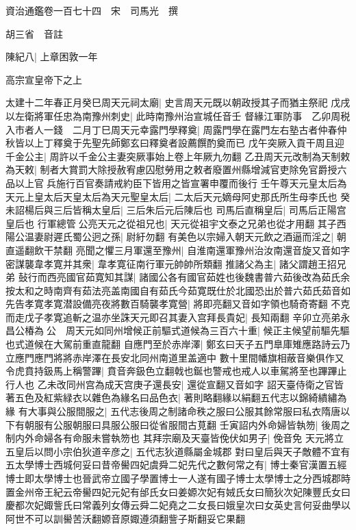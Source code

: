 資治通鑑卷一百七十四　宋　司馬光　撰

胡三省　音註

陳紀八|{
	上章困敦一年}


高宗宣皇帝下之上

太建十二年春正月癸巳周天元祠太廟|{
	史言周天元既以朝政授其子而猶主祭祀}
戊戌以左衛將軍任忠為南豫州刺史|{
	此時南豫州治宣城任音壬}
督緣江軍防事　乙卯周税入市者人一錢　二月丁巳周天元幸露門學釋奠|{
	周露門學在露門左右塾古者仲春仲秋皆以上丁釋奠于先聖先師鄭玄曰釋奠者設薦饌酌奠而已}
戊午突厥入貢干周且迎千金公主|{
	周許以千金公主妻突厥事始上卷上年厥九勿翻}
乙丑周天元改制為天制敕為天敕|{
	制者大賞罰大除授赦宥慮囚慰勞用之敕者廢置州縣增減官吏除免官爵授六品以上官兵施行百官奏請戒約臣下皆用之皆宣署申覆而後行}
壬午尊天元皇太后為天元上皇太后天皇太后為天元聖皇太后|{
	二太后天元嫡母阿史那氏所生母李氏也}
癸未詔楊后與三后皆稱太皇后|{
	三后朱后元后陳后也}
司馬后直稱皇后|{
	司馬后正陽宫皇后也}
行軍總管公亮天元之從祖兄也|{
	天元從祖宇文泰之兄弟也從才用翻}
其子西陽公温妻尉遲氏蜀公迥之孫|{
	尉紆勿翻}
有美色以宗婦入朝天元飲之酒逼而淫之|{
	朝直遥翻飲干禁翻}
亮聞之懼三月軍還至豫州|{
	自淮南還軍豫州治汝南還音旋又音如字}
密謀襲韋孝寛并其衆|{
	韋孝寛征南行軍元帥帥所類翻}
推諸父為主|{
	諸父謂趙王招兄弟}
鼔行而西亮國官茹寛知其謀|{
	諸國公各有國官茹姓也後魏書普六茹後改為茹氏余按太和之時南齊有茹法亮盖南國自有茹氏今茹寛既仕於北國恐出於普六茹氏茹音如}
先告孝寛孝寛潜設備亮夜將數百騎襲孝寛營|{
	將即亮翻又音如字領也騎奇寄翻}
不克而走戊子孝寛追斬之温亦坐誅天元即召其妻入宫拜長貴妃|{
	長知兩翻}
辛卯立亮弟永昌公椿為公　周天元如同州增候正前驅式道候為三百六十重|{
	候正主候望前驅先驅也式道候在大駕前重直龍翻}
自應門至於赤岸澤|{
	鄭玄曰天子五門臯庫雉應路詩云乃立應門應門將將赤岸澤在長安北同州南道里盖適中}
數十里間幡旗相蔽音樂俱作又令虎賁持鈒馬上稱警蹕|{
	賁音奔鈒色立翻戟也鋋也警戒也戒人以車駕將至也蹕蹕止行人也}
乙未改同州宫為成天宫庚子還長安|{
	還從宣翻又音如字}
詔天臺侍衛之官皆著五色及紅紫緑衣以雜色為緣名曰品色衣|{
	著則略翻緣以絹翻五代志以錦綺繢繡為緣}
有大事與公服間服之|{
	五代志後周之制諸命秩之服曰公服其餘常服曰私衣隋唐以下有朝服有公服朝服曰具服公服曰從省服間古莧翻}
壬寅詔内外命婦皆執笏|{
	後周之制内外命婦各有命服未嘗執笏也}
其拜宗廟及天臺皆俛伏如男子|{
	俛音免}
天元將立五皇后以問小宗伯狄道辛彦之|{
	五代志狄道縣屬金城郡}
對曰皇后與天子敵體不宜有五太學博士西城何妥曰昔帝嚳四妃虞舜二妃先代之數何常之有|{
	博士秦官漢置五經博士即太學博士也晉武帝立國子學置博士一人遂有國子博士太學博士之分西城郡時置金州帝王紀云帝嚳四妃元妃有邰氏女曰姜嫄次妃有娀氏女曰簡狄次妃陳豐氏女曰慶都次妃娵訾氏曰常義列女傳云舜二妃堯之二女長曰娥皇次曰女英史言何妥曲學以阿世不可以訓嚳苦沃翻嫄音原娵遵須翻訾子斯翻妥它果翻}
